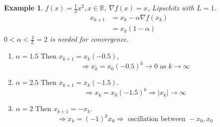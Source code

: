 \documentclass[11pt,a4paper]{article}
\newtheorem{example}{Example}
\begin{document}
\begin{example}
    $f(x)=\frac{1}{2}x^2,x\in \mathbb{R}$, $\nabla f(x)=x$, Lipschitz with $L=1$.
    \begin{equation}
        \begin{aligned}
            x_{k+1}&=x_k-\alpha \nabla f(x_k)\\
            &=x_k(1-\alpha)
        \end{aligned}
        \nonumber
    \end{equation}
    $0<\alpha<\frac{2}{L}=2$ is needed for convergence.
\end{example}

\begin{enumerate}[Test $(1)$]
    \item $\alpha=1.5$ Then $x_{k+1}=x_k(-0.5)$, $$\Rightarrow x_k=x_0(-0.5)^k \rightarrow 0 \text{ as } k \rightarrow \infty$$
    \item $\alpha=2.5$ Then $x_{k+1}=x_k(-1.5)$. $$\Rightarrow x_k=x_0(-1.5)^k \Rightarrow	|x_k| \rightarrow	\infty$$
    \item $\alpha=2$ Then $x_{k+1}=-x_k$. $$\Rightarrow	 x_k=(-1)^kx_0 \Rightarrow \text{ oscillation between }-x_0,x_0$$
\end{enumerate}
\end{document}
